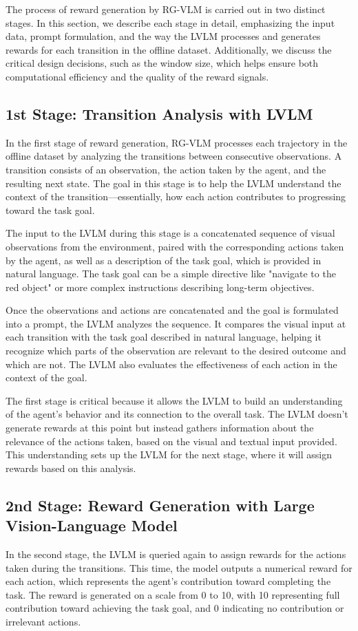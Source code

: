 \documentclass[master,english,final]{kaist-ucs}
\begin{document}
The process of reward generation by RG-VLM is carried out in two distinct stages. In this section, we describe each stage in detail, emphasizing the input data, prompt formulation, and the way the LVLM processes and generates rewards for each transition in the offline dataset. Additionally, we discuss the critical design decisions, such as the window size, which helps ensure both computational efficiency and the quality of the reward signals.

\subsection{1st Stage: Transition Analysis with LVLM}
In the first stage of reward generation, RG-VLM processes each trajectory in the offline dataset by analyzing the transitions between consecutive observations. A transition consists of an observation, the action taken by the agent, and the resulting next state. The goal in this stage is to help the LVLM understand the context of the transition—essentially, how each action contributes to progressing toward the task goal.

The input to the LVLM during this stage is a concatenated sequence of visual observations from the environment, paired with the corresponding actions taken by the agent, as well as a description of the task goal, which is provided in natural language. The task goal can be a simple directive like "navigate to the red object" or more complex instructions describing long-term objectives.

Once the observations and actions are concatenated and the goal is formulated into a prompt, the LVLM analyzes the sequence. It compares the visual input at each transition with the task goal described in natural language, helping it recognize which parts of the observation are relevant to the desired outcome and which are not. The LVLM also evaluates the effectiveness of each action in the context of the goal.

The first stage is critical because it allows the LVLM to build an understanding of the agent's behavior and its connection to the overall task. The LVLM doesn’t generate rewards at this point but instead gathers information about the relevance of the actions taken, based on the visual and textual input provided. This understanding sets up the LVLM for the next stage, where it will assign rewards based on this analysis.

\subsection{2nd Stage: Reward Generation with Large Vision-Language Model}
In the second stage, the LVLM is queried again to assign rewards for the actions taken during the transitions. This time, the model outputs a numerical reward for each action, which represents the agent's contribution toward completing the task. The reward is generated on a scale from 0 to 10, with 10 representing full contribution toward achieving the task goal, and 0 indicating no contribution or irrelevant actions.
\end{document}
